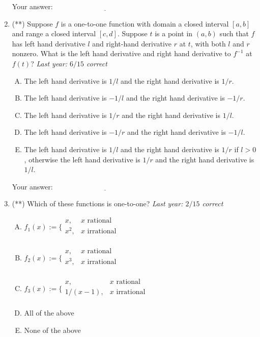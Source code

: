 \documentclass[10pt]{amsart}
\begin{document}
\begin{enumerate}
  \vspace{0.1in}
  Your answer: $\underline{\qquad\qquad\qquad\qquad\qquad\qquad\qquad}$
  \vspace{0.6in}

\item (**) Suppose $f$ is a one-to-one function with domain a closed
  interval $[a,b]$ and range a closed interval $[c,d]$. Suppose $t$ is
  a point in $(a,b)$ such that $f$ has left hand derivative $l$ and
  right-hand derivative $r$ at $t$, with both $l$ and $r$
  nonzero. What is the left hand derivative and right hand derivative
  to $f^{-1}$ at $f(t)$? {\em Last year: $6/15$ correct}

  \begin{enumerate}[(A)]
  \item The left hand derivative is $1/l$ and the right hand
    derivative is $1/r$.
  \item The left hand derivative is $-1/l$ and the right hand
    derivative is $-1/r$.
  \item The left hand derivative is $1/r$ and the right hand
    derivative is $1/l$.
  \item The left hand derivative is $-1/r$ and the right hand
    derivative is $-1/l$.
  \item The left hand derivative is $1/l$ and the right hand
    derivative is $1/r$ if $l > 0$, otherwise the left hand derivative
    is $1/r$ and the right hand derivative is $1/l$.
  \end{enumerate}
  
  \vspace{0.1in}
  Your answer: $\underline{\qquad\qquad\qquad\qquad\qquad\qquad\qquad}$
  \vspace{0.6in}


\item (**) Which of these functions is one-to-one? {\em Last year:
    $2/15$ correct}

  \begin{enumerate}[(A)]
  \item $f_1(x) := \lbrace \begin{array}{rl} x, & x \text{ rational} \\ x^2, & x \text{ irrational}\\\end{array}$ 
  \item $f_2(x) := \lbrace \begin{array}{rl} x, & x \text{ rational} \\ x^3, & x \text{ irrational}\\\end{array}$
  \item $f_3(x) := \lbrace\begin{array}{rl} x, & x \text{ rational} \\ 1/(x - 1), & x \text{ irrational}\\\end{array}$
  \item All of the above
  \item None of the above
  \end{enumerate}


\end{enumerate}
\end{document}
